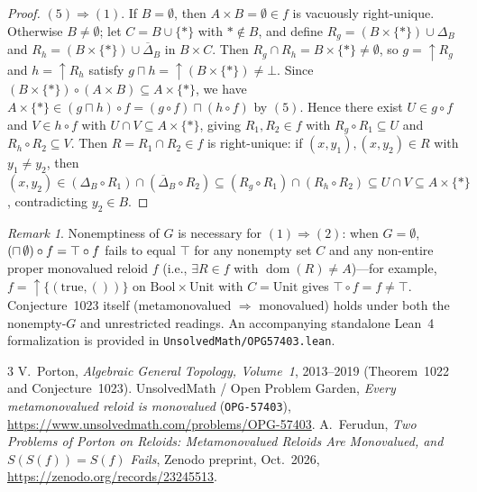 \documentclass[11pt]{article}
\theoremstyle{remark}
\newtheorem*{remark}{Remark}
\newcommand{\bigsqcap}{\mathop{\mathchoice{\vcenter{\hbox{\Large$\sqcap$}}}{\sqcap}{\sqcap}{\sqcap}}}
\begin{document}
\begin{proof}
\medskip\noindent
$(5) \Rightarrow (1)$.
If $B = \emptyset$, then $A \times B = \emptyset \in f$ is vacuously right-unique.
Otherwise $B \neq \emptyset$; let $C = B \cup \{\ast\}$ with $\ast \notin B$, and define $R_g = (B \times \{\ast\}) \cup \Delta_B$ and $R_h = (B \times \{\ast\}) \cup \overline{\Delta}_B$ in $B \times C$.
Then $R_g \cap R_h = B \times \{\ast\} \neq \emptyset$, so $g = \uparrow R_g$ and $h = \uparrow R_h$ satisfy $g \sqcap h = \uparrow(B \times \{\ast\}) \neq \bot$.
Since $(B \times \{\ast\}) \circ (A \times B) \subseteq A \times \{\ast\}$, we have $A \times \{\ast\} \in (g \sqcap h) \circ f = (g \circ f) \sqcap (h \circ f)$ by $(5)$.
Hence there exist $U \in g \circ f$ and $V \in h \circ f$ with $U \cap V \subseteq A \times \{\ast\}$, giving $R_1, R_2 \in f$ with $R_g \circ R_1 \subseteq U$ and $R_h \circ R_2 \subseteq V$.
Then $R = R_1 \cap R_2 \in f$ is right-unique: if $(x, y_1), (x, y_2) \in R$ with $y_1 \neq y_2$, then $(x, y_2) \in (\Delta_B \circ R_1) \cap (\overline{\Delta}_B \circ R_2) \subseteq (R_g \circ R_1) \cap (R_h \circ R_2) \subseteq U \cap V \subseteq A \times \{\ast\}$, contradicting $y_2 \in B$.
\end{proof}

\begin{remark}
Nonemptiness of $G$ is necessary for $(1) \Rightarrow (2)$: when $G = \emptyset$, $(\bigsqcap \emptyset) \circ f = \top \circ f$ fails to equal $\top$ for any nonempty set $C$ and any non-entire proper monovalued reloid $f$ (i.e., $\exists R \in f$ with $\operatorname{dom}(R) \neq A$)---for example, $f = \uparrow\{(\mathrm{true}, ())\}$ on $\mathrm{Bool} \times \mathrm{Unit}$ with $C = \mathrm{Unit}$ gives $\top \circ f = f \neq \top$.
Conjecture~1023 itself (metamonovalued $\Rightarrow$ monovalued) holds under both the nonempty-$G$ and unrestricted readings.
An accompanying standalone Lean~4 formalization is provided in \texttt{UnsolvedMath/OPG57403.lean}.
\end{remark}

\begin{thebibliography}{3}
 V.~Porton, \emph{Algebraic General Topology, Volume~1}, 2013--2019 (Theorem~1022 and Conjecture~1023).
 UnsolvedMath / Open Problem Garden, \emph{Every metamonovalued reloid is monovalued} (\texttt{OPG-57403}), \url{https://www.unsolvedmath.com/problems/OPG-57403}.
 A.~Ferudun, \emph{Two Problems of Porton on Reloids: Metamonovalued Reloids Are Monovalued, and $S(S(f)) = S(f)$ Fails}, Zenodo preprint, Oct.~2026, \url{https://zenodo.org/records/23245513}.
\end{thebibliography}
\end{document}
